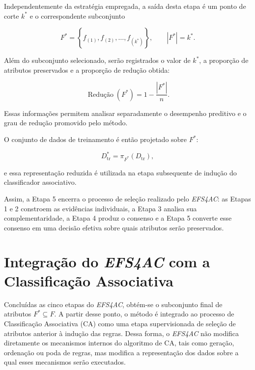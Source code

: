 Independentemente da estratégia empregada, a saída desta etapa é um ponto de
corte $k^{*}$ e o correspondente subconjunto

\begin{equation}
    F^{*}
    =
    \left\{
        f_{(1)},f_{(2)},\ldots,f_{(k^{*})}
    \right\},
    \qquad
    |F^{*}|=k^{*}.
    \label{eq:subset-final-ac-efs}
\end{equation}

Além do subconjunto selecionado, serão registrados o valor de $k^{*}$, a
proporção de atributos preservados e a proporção de redução obtida:

\begin{equation}
    \operatorname{Redução}(F^{*})
    =
    1-\frac{|F^{*}|}{n}.
    \label{eq:reducao-ac-efs}
\end{equation}

Essas informações permitem analisar separadamente o desempenho preditivo e o
grau de redução promovido pelo método.

O conjunto de dados de treinamento é então projetado sobre $F^{*}$:

\begin{equation}
    D_{\mathrm{tr}}^{*}
    =
    \pi_{F^{*}}
    \left(
        D_{\mathrm{tr}}
    \right),
    \label{eq:projecao-ac-efs}
\end{equation}

e essa representação reduzida é utilizada na etapa subsequente de indução do
classificador associativo.

Assim, a Etapa 5 encerra o processo de seleção realizado pelo
\textit{EFS4AC}: as Etapas 1 e 2 constroem as evidências individuais, a
Etapa 3 analisa sua complementaridade, a Etapa 4 produz o consenso e a
Etapa 5 converte esse consenso em uma decisão efetiva sobre quais atributos
serão preservados.
\section{Integração do \textit{EFS4AC} com a Classificação Associativa}
\label{sec:ac-efs-integracao}

Concluídas as cinco etapas do \textit{EFS4AC}, obtém-se o subconjunto final de
atributos $F^{*}\subseteq F$. A partir desse ponto, o método é integrado ao
processo de Classificação Associativa (CA) como uma etapa supervisionada de
seleção de atributos anterior à indução das regras. Dessa forma, o
\textit{EFS4AC} não modifica diretamente os mecanismos internos do algoritmo
de CA, tais como geração, ordenação ou poda de regras, mas modifica a
representação dos dados sobre a qual esses mecanismos serão executados.

